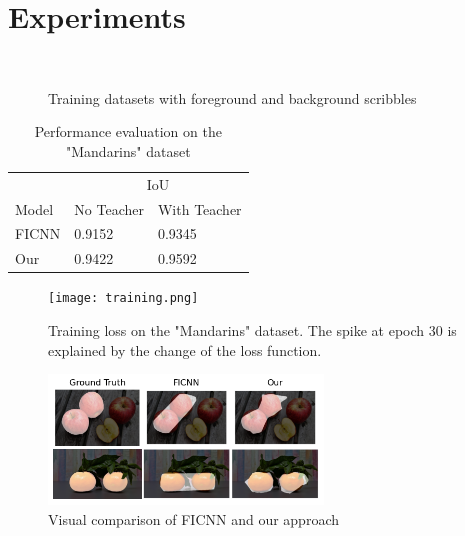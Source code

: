 \section{Experiments}
\label{experiments}

\begin{figure}
    \centering
     \\
    \caption{Training datasets with foreground and background scribbles}
    \label{data}
\end{figure}

\begin{table}
    \centering
    \caption{Performance evaluation on the "Mandarins" dataset}
    \begin{tabular}{lll}
        \toprule
              & \multicolumn{2}{c}{IoU}                \\
        \cmidrule(r){2-3}
        Model & No Teacher              & With Teacher \\
        \midrule
        FICNN & 0.9152                  & 0.9345       \\
        Our   & 0.9422                  & 0.9592       \\
        \bottomrule
    \end{tabular}
    \label{exp}
\end{table}

\begin{figure}
    \centering
    \texttt{[image: training.png]}
    \caption{Training loss on the "Mandarins" dataset.
        The spike at epoch 30 is explained by the change of the loss function.}
    \label{training}
\end{figure}

\begin{figure}
    \centering
    \includegraphics[width=0.65\textwidth]{resources/segmentation_result.png}
    \caption{Visual comparison of FICNN and our approach}
    \label{visual}
\end{figure}


